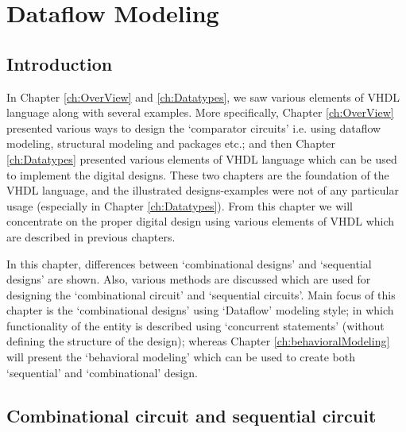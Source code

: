 \chapter{Dataflow Modeling} \label{ch:dataflowModeling}

\graphicspath{{Chapters/Dataflow/Figures/}}


%

\section{Introduction}
In Chapter \ref{ch:OverView} and \ref{ch:Datatypes}, we saw various elements of VHDL language along with several examples. More specifically, Chapter \ref{ch:OverView} presented various ways to design the `comparator circuits' i.e. using dataflow modeling, structural modeling and packages etc.; and then Chapter \ref{ch:Datatypes} presented various elements of VHDL language which can be used to implement the digital designs. These two chapters are the foundation of the VHDL language, and the illustrated designs-examples were not of any particular usage (especially in Chapter \ref{ch:Datatypes}). From this chapter we will concentrate on the proper digital design using various elements of VHDL which are described in previous chapters.  

In this chapter, differences between `combinational designs' and `sequential designs' are shown. Also, various methods are discussed which are used for designing the `combinational circuit' and `sequential circuits'. Main focus of this chapter is the `combinational designs' using `Dataflow' modeling style; in which functionality of the entity is described using `concurrent statements' (without defining the structure of the design); whereas Chapter \ref{ch:behavioralModeling} will present the `behavioral modeling' which can be used to create both `sequential' and `combinational' design. 

\section{Combinational circuit and sequential circuit}\label{sec:combSeqCircuit}

